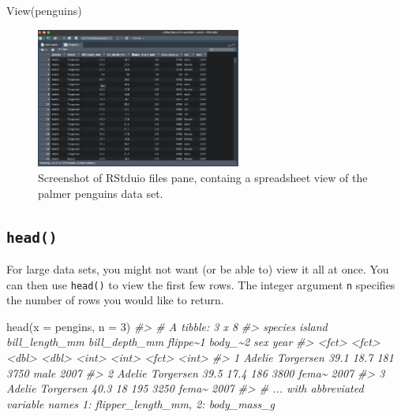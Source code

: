 \documentclass[
  12pt,
]{book}
\newenvironment{Shaded}{\begin{snugshade}}{\end{snugshade}}
\newcommand{\AttributeTok}[1]{\textcolor[rgb]{0.77,0.63,0.00}{#1}}
\newcommand{\CommentTok}[1]{\textcolor[rgb]{0.56,0.35,0.01}{\textit{#1}}}
\newcommand{\DecValTok}[1]{\textcolor[rgb]{0.00,0.00,0.81}{#1}}
\newcommand{\FunctionTok}[1]{\textcolor[rgb]{0.00,0.00,0.00}{#1}}
\newcommand{\NormalTok}[1]{#1}
\begin{document}
\begin{Shaded}
\begin{Highlighting}[]
\FunctionTok{View}\NormalTok{(penguins)}
\end{Highlighting}
\end{Shaded}

\begin{figure}
\centering
\includegraphics[width=0.6\textwidth,height=\textheight]{images/301-edav-wrangling/view-penguins-screenshot.png}
\caption{Screenshot of RStduio files pane, containg a spreadsheet view of the palmer penguins data set.}
\end{figure}

\hypertarget{head}{%
\subsection{\texorpdfstring{\texttt{head()}}{head()}}\label{head}}

For large data sets, you might not want (or be able to) view it all at once. You can then use \texttt{head()} to view the first few rows. The integer argument \texttt{n} specifies the number of rows you would like to return.

\begin{Shaded}
\begin{Highlighting}[]
\FunctionTok{head}\NormalTok{(}\AttributeTok{x =}\NormalTok{ pengins, }\AttributeTok{n =} \DecValTok{3}\NormalTok{)}
\CommentTok{\#\textgreater{} \# A tibble: 3 x 8}
\CommentTok{\#\textgreater{}   species island    bill\_length\_mm bill\_depth\_mm flippe\textasciitilde{}1 body\_\textasciitilde{}2 sex    year}
\CommentTok{\#\textgreater{}   \textless{}fct\textgreater{}   \textless{}fct\textgreater{}              \textless{}dbl\textgreater{}         \textless{}dbl\textgreater{}    \textless{}int\textgreater{}   \textless{}int\textgreater{} \textless{}fct\textgreater{} \textless{}int\textgreater{}}
\CommentTok{\#\textgreater{} 1 Adelie  Torgersen           39.1          18.7      181    3750 male   2007}
\CommentTok{\#\textgreater{} 2 Adelie  Torgersen           39.5          17.4      186    3800 fema\textasciitilde{}  2007}
\CommentTok{\#\textgreater{} 3 Adelie  Torgersen           40.3          18        195    3250 fema\textasciitilde{}  2007}
\CommentTok{\#\textgreater{} \# ... with abbreviated variable names 1: flipper\_length\_mm, 2: body\_mass\_g}
\end{Highlighting}
\end{Shaded}
\end{document}
